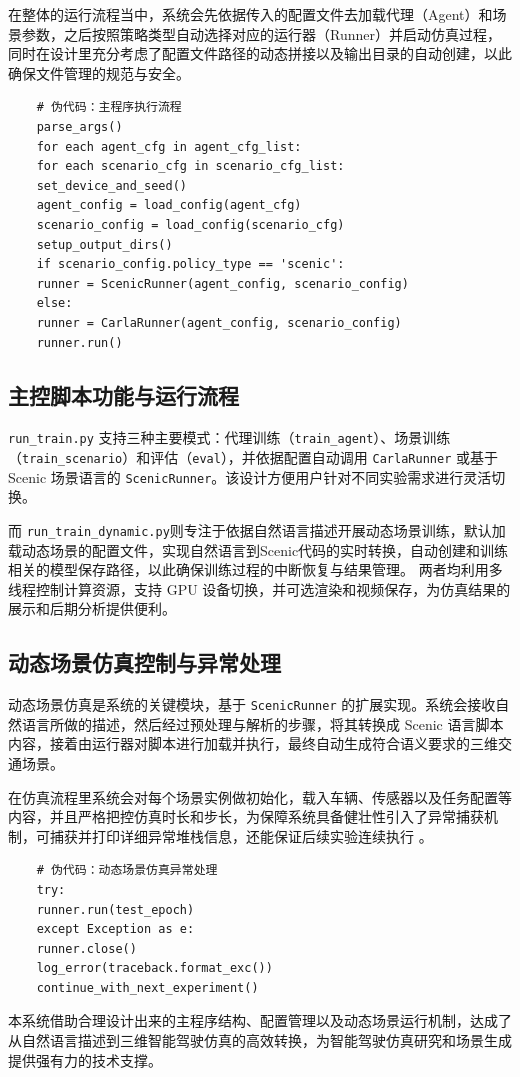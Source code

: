 在整体的运行流程当中，系统会先依据传入的配置文件去加载代理（Agent）和场景参数，之后按照策略类型自动选择对应的运行器（Runner）并启动仿真过程，同时在设计里充分考虑了配置文件路径的动态拼接以及输出目录的自动创建，以此确保文件管理的规范与安全。

\begin{verbatim}
	# 伪代码：主程序执行流程
	parse_args()
	for each agent_cfg in agent_cfg_list:
	for each scenario_cfg in scenario_cfg_list:
	set_device_and_seed()
	agent_config = load_config(agent_cfg)
	scenario_config = load_config(scenario_cfg)
	setup_output_dirs()
	if scenario_config.policy_type == 'scenic':
	runner = ScenicRunner(agent_config, scenario_config)
	else:
	runner = CarlaRunner(agent_config, scenario_config)
	runner.run()
\end{verbatim}

\subsection{主控脚本功能与运行流程}

\texttt{run\_train.py} 支持三种主要模式：代理训练（\texttt{train\_agent}）、场景训练（\texttt{train\_scenario}）和评估（\texttt{eval}），并依据配置自动调用 \texttt{CarlaRunner} 或基于 Scenic 场景语言的 \texttt{ScenicRunner}。该设计方便用户针对不同实验需求进行灵活切换。

而 \texttt{run\_train\_dynamic.py}则专注于依据自然语言描述开展动态场景训练，默认加载动态场景的配置文件，实现自然语言到Scenic代码的实时转换，自动创建和训练相关的模型保存路径，以此确保训练过程的中断恢复与结果管理。
两者均利用多线程控制计算资源，支持 GPU 设备切换，并可选渲染和视频保存，为仿真结果的展示和后期分析提供便利。

\subsection{动态场景仿真控制与异常处理}

动态场景仿真是系统的关键模块，基于 \texttt{ScenicRunner} 的扩展实现。系统会接收自然语言所做的描述，然后经过预处理与解析的步骤，将其转换成 Scenic 语言脚本内容，接着由运行器对脚本进行加载并执行，最终自动生成符合语义要求的三维交通场景。

在仿真流程里系统会对每个场景实例做初始化，载入车辆、传感器以及任务配置等内容，并且严格把控仿真时长和步长，为保障系统具备健壮性引入了异常捕获机制，可捕获并打印详细异常堆栈信息，还能保证后续实验连续执行 。

\begin{verbatim}
	# 伪代码：动态场景仿真异常处理
	try:
	runner.run(test_epoch)
	except Exception as e:
	runner.close()
	log_error(traceback.format_exc())
	continue_with_next_experiment()
\end{verbatim}

本系统借助合理设计出来的主程序结构、配置管理以及动态场景运行机制，达成了从自然语言描述到三维智能驾驶仿真的高效转换，为智能驾驶仿真研究和场景生成提供强有力的技术支撑。
